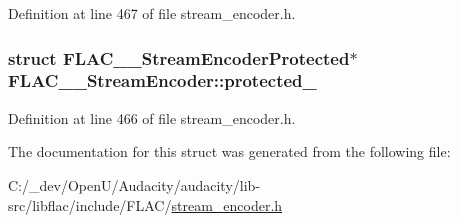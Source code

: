 Definition at line 467 of file stream\+\_\+encoder.\+h.

\subsubsection[{\texorpdfstring{protected\+\_\+}{protected_}}]{\setlength{\rightskip}{0pt plus 5cm}struct {\bf F\+L\+A\+C\+\_\+\+\_\+\+Stream\+Encoder\+Protected}$\ast$ F\+L\+A\+C\+\_\+\+\_\+\+Stream\+Encoder\+::protected\+\_\+}\hypertarget{struct_f_l_a_c_____stream_encoder_a2820d2ad5c6395289b2abc7dc7399f76}{}\label{struct_f_l_a_c_____stream_encoder_a2820d2ad5c6395289b2abc7dc7399f76}


Definition at line 466 of file stream\+\_\+encoder.\+h.



The documentation for this struct was generated from the following file\+:\begin{DoxyCompactItemize}
\item 
C\+:/\+\_\+dev/\+Open\+U/\+Audacity/audacity/lib-\/src/libflac/include/\+F\+L\+A\+C/\hyperlink{include_2_f_l_a_c_2stream__encoder_8h}{stream\+\_\+encoder.\+h}\end{DoxyCompactItemize}
